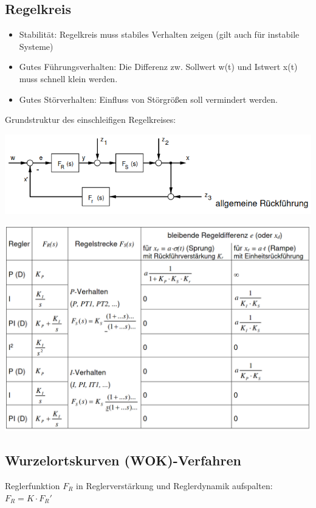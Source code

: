 \documentclass[10pt,a4paper]{article}
\begin{document}
\subsection{Regelkreis}
\begin{mdframed}[style=exercise,frametitle=Anforderungen:]
	\begin{itemize}
		\item Stabilität: Regelkreis muss stabiles Verhalten zeigen (gilt
		      auch für instabile Systeme)
		\item Gutes Führungsverhalten: Die Differenz zw. Sollwert w(t) und
		      Istwert x(t) muss schnell klein werden.
		\item Gutes Störverhalten: Einfluss von Störgrößen soll vermindert
		      werden.
	\end{itemize}
\end{mdframed}

Grundstruktur des einschleifigen Regelkreises:

\includegraphics[width=0.9\columnwidth]{Figures/einschleifiger Regelkreis.png}

\includegraphics[width=0.94\columnwidth]{Figures/Reglerauswahl.png}


\subsection{Wurzelortskurven (WOK)-Verfahren}
\begin{mdframed}[style=exercise]
	Reglerfunktion $F_R$ in Reglerverstärkung und Reglerdynamik aufspalten:
	$F_R =K \cdot F_R ' $
\end{mdframed}
\end{document}
